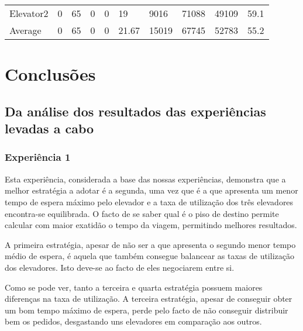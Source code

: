 \documentclass[a4paper]{article}
\begin{document}
\begin{table}[h]
\begin{tabular}{@{}llllllllll@{}}
Elevator2 & 0        & 65            & 0           & 0                                                               & 19                                                                  & 9016                                                         & 71088                                                 & 49109                                                   & 59.1         \\
Average   & 0     & 65         & 0        & 0                                                               & 21.67                                                               & 15019                                                         & 67745                                                 &  52783                                                  &  55.2        \\ \bottomrule
\end{tabular}
\end{table}

\newpage

\section{Conclusões}

\subsection{Da análise dos resultados das experiências levadas a cabo} 

\subsubsection{Experiência 1}

Esta experiência, considerada a base das nossas experiências, demonstra que a melhor estratégia a adotar é a segunda, uma vez que é a que apresenta um menor tempo de espera máximo pelo elevador e a taxa de utilização dos três elevadores encontra-se equilibrada. O facto de se saber qual é o piso de destino permite calcular com maior exatidão o tempo da viagem, permitindo melhores resultados.

A primeira estratégia, apesar de não ser a que apresenta o segundo menor tempo médio de espera, é aquela que também consegue balancear as taxas de utilização dos elevadores. Isto deve-se ao facto de eles negociarem entre si.

Como se pode ver, tanto a terceira e quarta estratégia possuem maiores diferenças na taxa de utilização. A terceira estratégia, apesar de conseguir obter um bom tempo máximo de espera, perde pelo facto de não conseguir distribuir bem os pedidos, desgastando uns elevadores em comparação aos outros.
\end{document}
